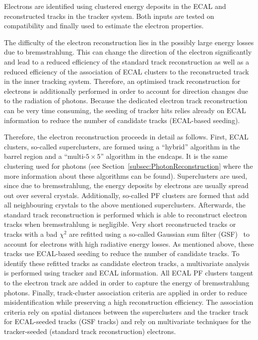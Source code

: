 Electrons are identified using clustered energy deposits in the ECAL and reconstructed tracks in the tracker system. 
Both inputs are tested on compatibility and finally used to estimate the electron properties. 

The difficulty of the electron reconstruction lies in the possibly large energy losses due to bremsstrahlung.
This can change the direction of the electron significantly and lead to a reduced efficiency of the standard track reconstruction as well as a reduced efficiency of the association of ECAL clusters to the reconstructed track in the inner tracking system.
Therefore, an optimised track reconstruction for electrons is additionally performed in order to account for direction changes due to the radiation of photons.
Because the dedicated electron track reconstruction can be very time consuming, the seeding of tracker hits relies already on ECAL information to reduce the number of candidate tracks (ECAL-based seeding).

Therefore, the electron reconstruction proceeds in detail as follows.
First, ECAL clusters, so-called superclusters, are formed using a ``hybrid'' algorithm in the barrel region and a ``multi-$5\times 5$'' algorithm in the endcaps.
It is the same clustering used for photons (see Section~\ref{subsec:PhotonReconstruction} where the more information about these algorithms can be found).
Superclusters are used, since due to bremsstrahlung, the energy deposits by electrons are usually spread out over several crystals.
Additionally, so-called PF clusters are formed that add all neighbouring crystals to the above mentioned superclusters. 
Afterwards, the standard track reconstruction is performed which is able to reconstruct electron tracks when bremsstrahlung is negligible.
Very short reconstructed tracks or tracks with a bad $\chi^2$ are refitted using a so-called Gaussian sum filter (GSF)~\cite{bib:GSF_2003} to account for electrons with high radiative energy losses.
As mentioned above, these tracks use ECAL-based seeding to reduce the number of candidate tracks.  
To identify these refitted tracks as candidate electron tracks, a multivariate analysis is performed using tracker and ECAL information.
All ECAL PF clusters tangent to the electron track are added in order to capture the energy of bremsstrahlung photons.
Finally, track-cluster association criteria are applied in order to reduce misidentification while preserving a high reconstruction efficiency.
The association criteria rely on spatial distances between the superclusters and the tracker track for ECAL-seeded tracks (GSF tracks) and rely on multivariate techniques for the tracker-seeded (standard track reconstruction) electrons.


